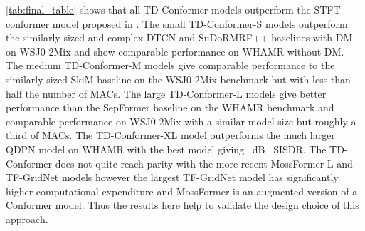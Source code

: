 \autoref{tab:final_table} shows that all TD-Conformer models outperform the \ac{STFT} conformer model proposed in \cite{cssconformer}. The small TD-Conformer-S models outperform the similarly sized and complex DTCN and SuDoRMRF++ baselines \cite{deformtcn,sudormrf} with \ac{DM} on WSJ0-2Mix and show comparable performance on WHAMR without \ac{DM}. The medium TD-Conformer-M models give comparable performance to the similarly sized SkiM baseline \cite{skim} on the WSJ0-2Mix benchmark but with less than half the number of \ac{MACs}. The large TD-Conformer-L models give better performance than the SepFormer baseline on the WHAMR benchmark and comparable performance on WSJ0-2Mix with a similar model size but roughly a third of \ac{MACs}. The TD-Conformer-XL model outperforms the much larger \ac{QDPN} model on WHAMR with the best model giving ~dB ~SISDR. The TD-Conformer does not quite reach parity with the more recent MossFormer-L and TF-GridNet \cite{mossformer, tfgridnettasl} models however the largest TF-GridNet model has significantly higher computational expenditure and MossFormer is an augmented version of a Conformer model. Thus the results here help to validate the design choice of this approach.
